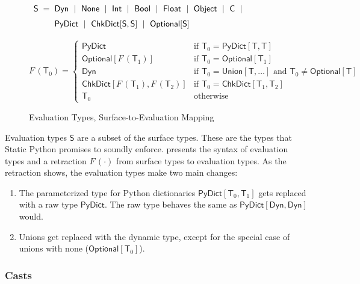 \documentclass[english,cleveref,submission]{programming}
\makeatletter
\newcommand{\SP}{Static Python}
\newcommand{\defeq}{=}
\newcommand{\mfeq}{=}
\newcommand{\langmid}{~\mid~} %
\newenvironment{langarray}{\(\def\arraystretch{1.5}\begin{array}{l@{\hspace{2mm}}c@{\hspace{2mm}}l}}{\end{array}\)}
\newcommand{\typefont}[1]{\mathsf{#1}}
\newcommand{\paramtype}[2]{#1[#2]}
\newcommand{\sptype}{\typefont{T}}
\newcommand{\spteval}{\typefont{S}}
\newcommand{\sptclass}{\typefont{C}}
\newcommand{\sptint}{\typefont{Int}}
\newcommand{\sptbool}{\typefont{Bool}}
\newcommand{\sptfloat}{\typefont{Float}}
\newcommand{\sptdyn}{\typefont{Dyn}}
\newcommand{\sptobject}{\typefont{Object}}
\newcommand{\sptnone}{\typefont{None}}
\newcommand{\sptoptional}[1]{\paramtype{\typefont{Optional}}{#1}}
\newcommand{\sptunion}[1]{\paramtype{\typefont{Union}}{#1}}
\newcommand{\sptrawpydict}{\typefont{PyDict}}
\newcommand{\sptpydict}[2]{\paramtype{\sptrawpydict}{#1, #2}}
\newcommand{\sptchkdict}[2]{\paramtype{\typefont{ChkDict}}{#1, #2}}
\newcommand{\mfapply}[2]{#1\,(#2)}
\newcommand{\mffont}[1]{\mathit{#1}}
\newcommand{\mftypeF}[1]{\mfapply{\mffont{F}}{#1}} %
\makeatother
\begin{document}
\begin{figure}[t]
  \begin{langarray}
    \spteval & \defeq &
      \sptdyn \langmid
      \sptnone \langmid
      \sptint \langmid
      \sptbool \langmid
      \sptfloat \langmid
      \sptobject \langmid
      \sptclass \langmid
    \\ & &
      \sptrawpydict \langmid
      \sptchkdict{\spteval}{\spteval} \langmid
      \sptoptional{\spteval}
  \end{langarray}

  \bigskip
  \(
    \mftypeF{\sptype_0}
    \mfeq
    \left\{\begin{array}{ll}
      \sptrawpydict & \mbox{if $\sptype_0 = \sptpydict{\sptype}{\sptype}$}
    \\
      \sptoptional{\mftypeF{\sptype_1}} & \mbox{if $\sptype_0 = \sptoptional{\sptype_1}$}
    \\
      \sptdyn & \mbox{if $\sptype_0 = \sptunion{\sptype, \ldots}$ and $\sptype_0 \neq \sptoptional{\sptype}$}
    \\
      \sptchkdict{\mftypeF{\sptype_1}}{\mftypeF{\sptype_2}} & \mbox{if $\sptype_0 = \sptchkdict{\sptype_1}{\sptype_2}$}
    \\
      \sptype_0 & \mbox{otherwise}
    \end{array}\right.
  \)

  \caption{Evaluation Types, Surface-to-Evaluation Mapping}
  \label{f:surface-to-eval-types}
\end{figure}

Evaluation types $\spteval$ are a subset of the surface types.
These are the types that \SP{} promises to soundly enforce.
 presents the syntax of evaluation types
and a retraction $\mftypeF{\cdot}$ from surface types to evaluation types.
As the retraction shows, the evaluation types make two main changes:
\begin{enumerate}
  \item
    The parameterized type for Python dictionaries
    $\sptpydict{\sptype_0}{\sptype_1}$ gets replaced with
    a raw type $\sptrawpydict$.
    The raw type behaves the same as $\sptpydict{\sptdyn}{\sptdyn}$ would.
  \item
    Unions get replaced with the dynamic type, except for the special case
    of unions with none ($\sptoptional{\sptype_0}$).
\end{enumerate}


\subsubsection{Casts}
\end{document}
